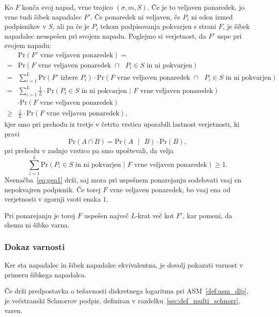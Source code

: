 \documentclass[isrm2, tisk]{fmfdelo}
\begin{document}
\begin{dokaz}
    Ko $F$ konča svoj napad, vrne trojico $(\sigma, m, S)$. Če je to veljaven ponaredek, jo vrne tudi
    šibek napadalec $F'$. Če ponaredek ni veljaven, če $P_i$ ni eden izmed podpisnikov v $S$, ali pa
    če je $P_i$ tekom podpisovanja pokvarjen s strani $F$, je šibek napadalec neuspešen pri svojem napadu.
    Poglejmo si verjetnost, da $F'$ uspe pri svojem napadu:
    \begin{align*}
          &\text{Pr}(\text{$F'$ vrne veljaven ponaredek}) = \\
        = &\text{Pr}(\text{$F$ vrne veljaven ponaredek } \cap \text{ $P_i \in S$ in ni pokvarjen}) \\
        = &\sum_{i=1}^L \text{Pr}(\text{$F'$ izbere $P_i$}) \cdot 
            \text{Pr}(\text{$F$ vrne veljaven ponaredek } \cap \text{ $P_i \in S$ in ni pokvarjen}) \\
        = &\sum_{i=1}^L \frac{1}{L} \cdot 
            \text{Pr}(\text{$P_i \in S$ in ni pokvarjen | $F$ vrne veljaven ponaredek}) \\
          &\cdot \text{Pr}(\text{$F$ vrne veljaven ponaredek}) \\
        \geq &\frac{1}{L} \cdot \text{Pr}(\text{$F$ vrne veljaven ponaredek}),
    \end{align*}
kjer smo pri prehodu iz tretje v četrto vrstico uporabili lastnost verjetnosti, ki pravi
$$
\text{Pr}(A \cap B) = \text{Pr}(A \text{ }|\text{ } B) \cdot \text{Pr}(B),
$$
pri prehodu v zadnjo vrstico pa smo upoštevali, da velja
\begin{equation}
\label{eq:geq1}
\sum_{i=1}^L \text{Pr}(\text{$P_i \in S$ in ni pokvarjen | $F$ vrne veljaven ponaredek}) \geq 1.
\end{equation}
Neenačba~\eqref{eq:geq1} drži, saj mora pri uspešnem ponarejanju sodelovati vsaj en nepokvajren
podpisnik. Če torej $F$ vrne veljaven ponaredek, bo vsaj ena od verjetnosti v zgornji vsoti enaka $1$.

Pri ponarejanju je torej $F$ uspešen največ $L$-krat več kot $F'$, kar pomeni, da shema ni šibko
varna.
\end{dokaz}

\subsubsection{Dokaz varnosti}
Ker sta napadalec in šibek napadalec ekvivalentna, je dovolj pokazati varnost v primeru šibkega
napadalca.

\begin{izrek}
    Če drži predpostavka o težavnosti diskretnega logaritma pri ASM~\ref{def:asm_dlp}, je večstranski 
    Schnorrov podpis, definiran v razdelku~\ref{sec:def_multi_schnorr}, varen.
\end{izrek}
\end{document}
